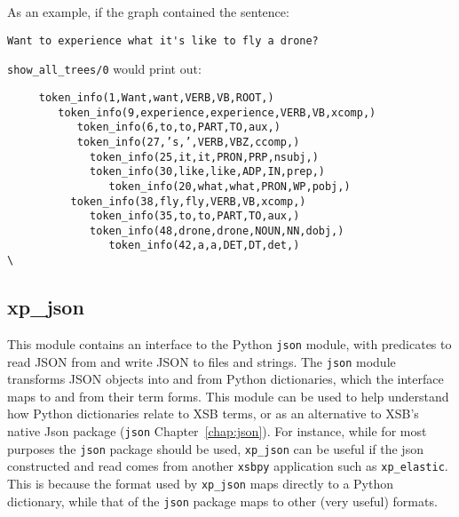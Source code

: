 \begin{itemize}
  As an example, if the graph contained the sentence:
\begin{verbatim}  
Want to experience what it's like to fly a drone?  
\end{verbatim}  
{\tt show\_all\_trees/0} would print out:
\begin{verbatim}
     token_info(1,Want,want,VERB,VB,ROOT,)
        token_info(9,experience,experience,VERB,VB,xcomp,)                                   
           token_info(6,to,to,PART,TO,aux,)                                                  
           token_info(27,’s,’,VERB,VBZ,ccomp,)                                               
             token_info(25,it,it,PRON,PRP,nsubj,)  
             token_info(30,like,like,ADP,IN,prep,)                                           
                token_info(20,what,what,PRON,WP,pobj,)                                       
          token_info(38,fly,fly,VERB,VB,xcomp,)                                              
             token_info(35,to,to,PART,TO,aux,)                                               
             token_info(48,drone,drone,NOUN,NN,dobj,)      
                token_info(42,a,a,DET,DT,det,)                                              \
\end{verbatim}
\end{itemize}  

\subsection{xp\_json}
This module contains an interface to the Python {\tt json} module,
with predicates to read JSON from and write JSON to files and strings.
The {\tt json} module transforms JSON objects into and from Python
dictionaries, which the interface maps to and from their term forms.
This module can be used to help understand how Python dictionaries
relate to XSB terms, or as an alternative to XSB's native Json package
({\tt json} Chapter~\ref{chap:json}).  For instance, while for most
purposes the {\tt json} package should be used, {\tt xp\_json} can be
useful if the json constructed and read comes from another {\tt xsbpy}
application such as {\tt xp\_elastic}.  This is because the format
used by {\tt xp\_json} maps directly to a Python dictionary, while
that of the {\tt json} package maps to other (very useful) formats.

